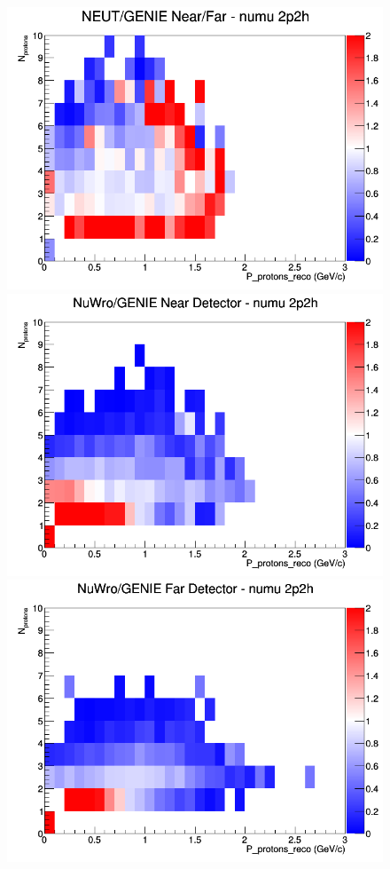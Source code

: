 \documentclass[12pt]{article}
\begin{document}
\begin{figure}[h]
\endminipage
{}
\includegraphics[width=\linewidth]{eff_N_P/GAr/protons/ratios/2p2h_NEUT_GENIE_numu_NF_N_P.png}
\endminipage
\newline
{}
\includegraphics[width=\linewidth]{eff_N_P/GAr/protons/ratios/2p2h_NuWro_GENIE_numu_near_N_P.png}
\endminipage
{}
\includegraphics[width=\linewidth]{eff_N_P/GAr/protons/ratios/2p2h_NuWro_GENIE_numu_far_N_P.png}

\end{figure}
\end{document}
